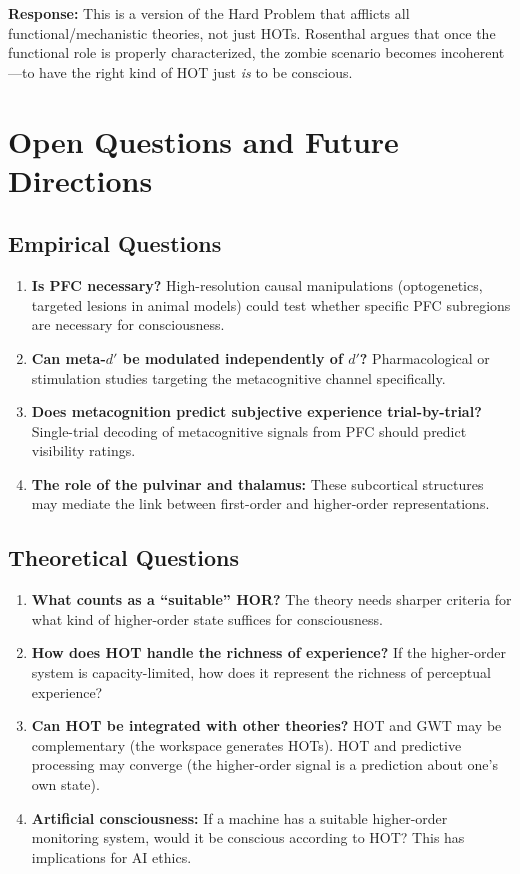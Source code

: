 \documentclass[11pt,a4paper]{report}
\begin{document}
\textbf{Response:} This is a version of the Hard Problem that afflicts all functional/mechanistic theories, not just HOTs. Rosenthal argues that once the functional role is properly characterized, the zombie scenario becomes incoherent---to have the right kind of HOT just \emph{is} to be conscious.


\chapter{Open Questions and Future Directions}

\section{Empirical Questions}

\begin{enumerate}[leftmargin=2em]
  \item \textbf{Is PFC necessary?} High-resolution causal manipulations (optogenetics, targeted lesions in animal models) could test whether specific PFC subregions are necessary for consciousness.
  \item \textbf{Can meta-$d'$ be modulated independently of $d'$?} Pharmacological or stimulation studies targeting the metacognitive channel specifically.
  \item \textbf{Does metacognition predict subjective experience trial-by-trial?} Single-trial decoding of metacognitive signals from PFC should predict visibility ratings.
  \item \textbf{The role of the pulvinar and thalamus:} These subcortical structures may mediate the link between first-order and higher-order representations.
\end{enumerate}

\section{Theoretical Questions}

\begin{enumerate}[leftmargin=2em]
  \item \textbf{What counts as a ``suitable'' HOR?} The theory needs sharper criteria for what kind of higher-order state suffices for consciousness.
  \item \textbf{How does HOT handle the richness of experience?} If the higher-order system is capacity-limited, how does it represent the richness of perceptual experience?
  \item \textbf{Can HOT be integrated with other theories?} HOT and GWT may be complementary (the workspace generates HOTs). HOT and predictive processing may converge (the higher-order signal is a prediction about one's own state).
  \item \textbf{Artificial consciousness:} If a machine has a suitable higher-order monitoring system, would it be conscious according to HOT? This has implications for AI ethics.
\end{enumerate}
\end{document}

